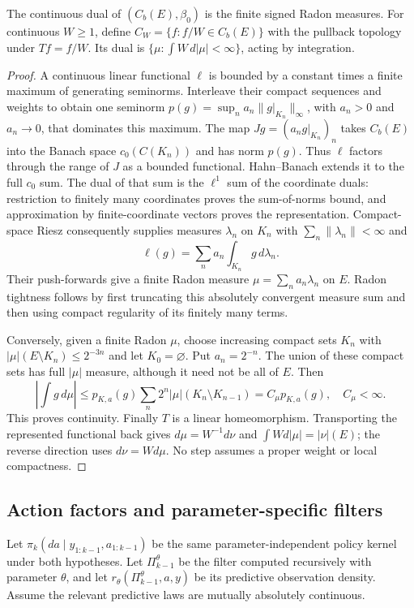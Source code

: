 \begin{theorem}
\label{prop:r33-c2-strict}
The continuous dual of $(C_b(E),\beta_0)$ is the finite signed Radon measures. For continuous $W\ge1$, define $C_W=\{f:f/W\in C_b(E)\}$ with the pullback topology under $Tf=f/W$. Its dual is $\{\mu:\int W\,d|\mu|<\infty\}$, acting by integration.
\end{theorem}
\begin{proof}
A continuous linear functional $\ell$ is bounded by a constant times a finite maximum of generating seminorms. Interleave their compact sequences and weights to obtain one seminorm $p(g)=\sup_n a_n\|g|_{K_n}\|_\infty$, with $a_n>0$ and $a_n\to0$, that dominates this maximum. The map $Jg=(a_ng|_{K_n})_n$ takes $C_b(E)$ into the Banach space $c_0(C(K_n))$ and has norm $p(g)$. Thus $\ell$ factors through the range of $J$ as a bounded functional. Hahn--Banach extends it to the full $c_0$ sum. The dual of that sum is the $\ell^1$ sum of the coordinate duals: restriction to finitely many coordinates proves the sum-of-norms bound, and approximation by finite-coordinate vectors proves the representation. Compact-space Riesz consequently supplies measures $\lambda_n$ on $K_n$ with $\sum_n\|\lambda_n\|<\infty$ and
\[
 \ell(g)=\sum_n a_n\int_{K_n}g\,d\lambda_n.
\]
Their push-forwards give a finite Radon measure $\mu=\sum_n a_n\lambda_n$ on $E$. Radon tightness follows by first truncating this absolutely convergent measure sum and then using compact regularity of its finitely many terms.

Conversely, given a finite Radon $\mu$, choose increasing compact sets $K_n$ with $|\mu|(E\setminus K_n)\le2^{-3n}$ and let $K_0=\varnothing$. Put $a_n=2^{-n}$. The union of these compact sets has full $|\mu|$ measure, although it need not be all of $E$. Then
\[
 \left|\int g\,d\mu\right|
 \le p_{K,a}(g)\sum_n 2^n|\mu|(K_n\setminus K_{n-1}) = C_\mu p_{K,a}(g),\quad C_\mu<\infty.
\]
This proves continuity. Finally $T$ is a linear homeomorphism. Transporting the represented functional back gives $d\mu=W^{-1}d\nu$ and $\int Wd|\mu|=|\nu|(E)$; the reverse direction uses $d\nu=Wd\mu$. No step assumes a proper weight or local compactness.
\end{proof}

\subsection{Action factors and parameter-specific filters}
Let $\pi_k(da\mid y_{1:k-1},a_{1:k-1})$ be the same parameter-independent policy kernel under both hypotheses. Let $\Pi_{k-1}^\theta$ be the filter computed recursively with parameter $\theta$, and let $r_\theta(\Pi_{k-1}^\theta,a,y)$ be its predictive observation density. Assume the relevant predictive laws are mutually absolutely continuous.


